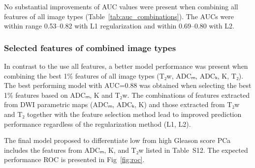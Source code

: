 No substantial improvements of AUC values were present when combining all
features of all image types (Table~\ref{tab:auc_combinations}). The AUCs were
within range 0.53--0.82 with L1 regularization and within 0.69--0.80 with L2.


\subsubsection{Selected features of combined image types}

In contrast to the use all features, a better model performance was present when
combining the best 1\% features of all image types (T₂w, ADCₘ, ADCₖ, K,
T₂). The best performing model with AUC=0.88 was obtained when selecting the
best 1\% features based on ADCₘ, K and T₂w. The combinations of features
extracted from DWI parametric maps (ADCₘ, ADCₖ, K) and those extracted from T₂w
and T₂ together with the feature selection method lead to improved prediction
performance regardless of the regularization method (L1, L2).

The final model proposed to differentiate low from high Gleason score PCa
includes the features from ADCₘ, K, and T₂w listed in Table~S12. The expected
performance ROC is presented in Fig~\ref{fig:roc}.
